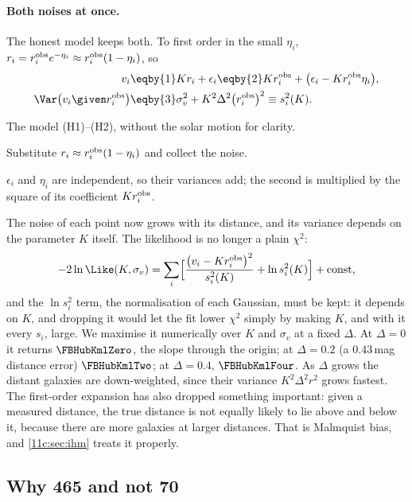 \paragraph{Both noises at once.} The honest model keeps both. To first order in
the small $\eta_i$, $r_i=r_i^{\rm obs}e^{-\eta_i}\approx r_i^{\rm obs}(1-\eta_i)$, so
\begin{align}
  v_i
  &\eqby{1}Kr_i+\epsilon_i
   \eqby{2}Kr_i^{\rm obs}+\bigl(\epsilon_i-Kr_i^{\rm obs}\eta_i\bigr),
  \nonumber\\
  \Var\bigl(v_i\given r_i^{\rm obs}\bigr)
  &\eqby{3}\sigma_v^2+K^2\Delta^2\bigl(r_i^{\rm obs}\bigr)^2\equiv s_i^2(K).
  \label{11c:eq:eff-var}
\end{align}
\begin{explain}
  \item The model (H1)--(H2), without the solar motion for clarity.
  \item Substitute $r_i\approx r_i^{\rm obs}(1-\eta_i)$ and collect the noise.
  \item $\epsilon_i$ and $\eta_i$ are independent, so their variances add; the second
        is multiplied by the square of its coefficient $Kr_i^{\rm obs}$.
\end{explain}
The noise of each point now grows with its distance, and its variance depends on
the parameter $K$ itself. The likelihood is no longer a plain $\chi^2$:
\[
  -2\ln\Like(K,\sigma_v)=\sum_i\Bigl[\frac{\bigl(v_i-Kr_i^{\rm obs}\bigr)^2}{s_i^2(K)}+\ln s_i^2(K)\Bigr]+\text{const},
\]
and the $\ln s_i^2$ term, the normalisation of each Gaussian, must be kept: it
depends on $K$, and dropping it would let the fit lower $\chi^2$ simply by making
$K$, and with it every $s_i$, large. We maximise it numerically over $K$ and $\sigma_v$ at a fixed
$\Delta$. At $\Delta=0$ it returns $\FBHubKmlZero$, the slope through the origin; at
$\Delta=0.2$ (a $0.43$\,mag distance error) $\FBHubKmlTwo$; at $\Delta=0.4$,
$\FBHubKmlFour$. As $\Delta$ grows the distant galaxies are down-weighted, since
their variance $K^2\Delta^2r^2$ grows fastest. The first-order expansion has also
dropped something important: given a measured distance, the true distance is not
equally likely to lie above and below it, because there are more galaxies at
larger distances. That is Malmquist bias, and \cref{11c:sec:ihm} treats it
properly.

\subsection{Why 465 and not 70}
\label{11c:sec:hubble-scale}

